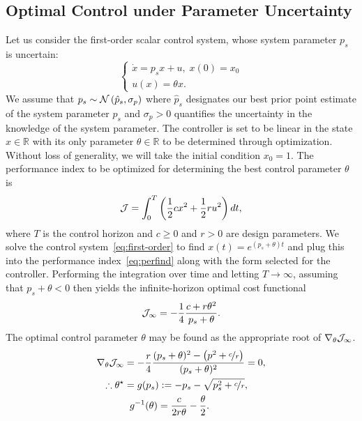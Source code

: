 \subsection{Optimal Control under Parameter Uncertainty}
%
Let us consider the first-order scalar control system, whose system parameter
$p_s$ is uncertain: 
%
\begin{equation} \begin{cases} \dot{x} = p_sx + u, \; x(0) =
  x_0 \\ u(x) = \theta x.  \end{cases} \label{eq:first-order} \end{equation}
%
We assume that $p_s \sim \mathcal{N}\left(\hat{p}_s, \sigma_{p}\right)$ where
$\hat{p}_s$ designates our best prior point estimate of the system parameter $p_s$
and $\sigma_{p} > 0$ quantifies the uncertainty in the knowledge of the system
parameter. The controller is set to be linear in the state $x \in \mathbb{R}$
with its only parameter $\theta \in \mathbb{R}$ to be determined through
optimization. Without loss of generality, we will take the initial condition
$x_0 = 1$. The performance index to be optimized for determining the best
control parameter $\theta$ is
%
\begin{equation} \mathcal{J} = \int_0^T \left(\frac{1}{2}cx^2 + \frac{1}{2}ru^2 \right) dt,
\label{eq:perfind} \end{equation}
%
where $T$ is the control horizon and $c \geq 0$ and $r > 0$ are design
parameters. We solve the control system~\eqref{eq:first-order} to find $x(t) =
e^{(p_s+\theta)t}$ and plug this into the performance index~\eqref{eq:perfind}
along with the form selected for the controller. Performing the integration over
time and letting $T \to \infty$, assuming that $p_s+\theta < 0$ then yields the
infinite-horizon optimal cost functional
\begin{equation} \mathcal{J}_\infty = -\frac{1}{4}\frac{c+r\theta^2}{p_s+\theta}.
\label{eq:inf-time-integrated-cost} \end{equation}
%
The optimal control parameter $\theta$ may be found as the appropriate root of
$\nabla_\theta \mathcal{J}_\infty$. 
%
\begin{align} 
    \begin{split} 
        \nabla_\theta \mathcal{J}_\infty &= -\frac{r}{4}\frac{(p_s+\theta)^2 - \left(p^2
        + \nicefrac{c}{r}\right)}{(p_s+\theta)^2} = 0, \\ 
        \therefore \theta^\star &= g(p_s) :=-p_s - \sqrt{p_s^2 + \nicefrac{c}{r}}, \\
        &\hspace{2mm} g^{-1}(\theta) = \frac{c}{2r\theta} - \frac{\theta}{2}.
    \end{split} 
    \label{eq:optimal_theta} 
\end{align}
